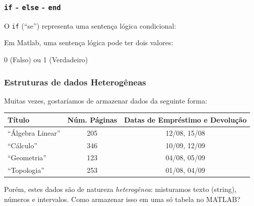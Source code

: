 \documentclass{beamer}
\newcommand{\code}[1]{{\texttt{#1}}}
\newcommand{\acode}[1]{\alert{\texttt{#1}}}
\newcommand{\codigo}[1]{\begin{center}\rm{\code{
  \begin{tabular}{r l}
  #1
  \end{tabular}
  }}\end{center}}
\newcommand{\ac}{\alert{\texttt{>>}}}
\begin{document}
\begin{frame}[fragile]
 \frametitle{\acode{if} - \acode{else} - \acode{end}}
  O \acode{if} (``se'') representa uma sentença lógica condicional: 
  \vskip1cm
  \begin{center}
  \end{center}

  Em Matlab, uma sentença lógica pode ter dois valores:\\
  \begin{center} 0 (Falso) ou 1 (Verdadeiro)\end{center}
\end{frame}
\begin{frame}
  \frametitle{Estruturas de dados Heterogêneas}

  Muitas vezes, gostaríamos de armazenar dados da seguinte forma:
  \begin{center}
     {\footnotesize{
           \begin{tabular}{l c c}
              Título & Núm. Páginas & Datas de Empréstimo e Devolução\\\toprule
              ``Álgebra Linear'' & 205 & 12/08, 15/08\\
              ``Cálculo'' & 346 & 10/09, 12/09\\
              ``Geometria'' & 123 & 04/08, 05/09\\
              ``Topologia'' & 253 & 01/08, 04/09
           \end{tabular}
        }}
  \end{center}
  Porém, estes dados são de natureza \emph{heterogênea}: misturamos texto (string), números e intervalos. Como armazenar isso em uma só tabela no MATLAB?
\end{frame}
\end{document}
